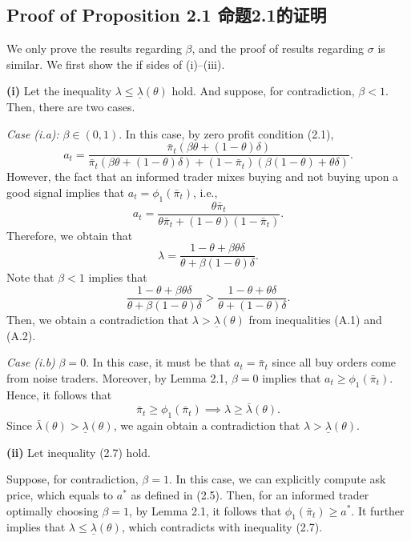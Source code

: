 \documentclass[12pt,a4paper]{article}
\newenvironment{original}{%
  \par\vspace{4pt}\noindent%
  \color{black}%
  \ignorespaces
}{%
  \par\vspace{2pt}%
}
\begin{document}
\subsection*{Proof of Proposition 2.1 \hfill 命题2.1的证明}

\begin{original}
We only prove the results regarding $\beta$, and the proof of results regarding $\sigma$ is similar. We first show the if sides of (i)--(iii).

\textbf{(i)} Let the inequality $\lambda \leq \underline{\lambda}(\theta)$ hold. And suppose, for contradiction, $\beta < 1$. Then, there are two cases.

\textit{Case (i.a):} $\beta \in (0, 1)$. In this case, by zero profit condition (2.1),
\[
a_t = \frac{\bar{\pi}_t(\beta\theta + (1-\theta)\delta)}{\bar{\pi}_t(\beta\theta + (1-\theta)\delta) + (1-\bar{\pi}_t)(\beta(1-\theta) + \theta\delta)}.
\]
However, the fact that an informed trader mixes buying and not buying upon a good signal implies that $a_t = \phi_1(\bar{\pi}_t)$, i.e.,
\[
a_t = \frac{\theta\bar{\pi}_t}{\theta\bar{\pi}_t + (1-\theta)(1-\bar{\pi}_t)}.
\]
Therefore, we obtain that
\[
\lambda = \frac{1 - \theta + \beta\theta\delta}{\theta + \beta(1-\theta)\delta}. \tag{A.1}
\]
Note that $\beta < 1$ implies that
\[
\frac{1 - \theta + \beta\theta\delta}{\theta + \beta(1-\theta)\delta} > \frac{1 - \theta + \theta\delta}{\theta + (1-\theta)\delta}. \tag{A.2}
\]
Then, we obtain a contradiction that $\lambda > \underline{\lambda}(\theta)$ from inequalities (A.1) and (A.2).

\textit{Case (i.b)} $\beta = 0$. In this case, it must be that $a_t = \bar{\pi}_t$ since all buy orders come from noise traders. Moreover, by Lemma 2.1, $\beta = 0$ implies that $a_t \geq \phi_1(\bar{\pi}_t)$. Hence, it follows that
\[
\bar{\pi}_t \geq \phi_1(\bar{\pi}_t) \implies \lambda \geq \bar{\lambda}(\theta).
\]
Since $\bar{\lambda}(\theta) > \underline{\lambda}(\theta)$, we again obtain a contradiction that $\lambda > \underline{\lambda}(\theta)$.

\textbf{(ii)} Let inequality (2.7) hold.

Suppose, for contradiction, $\beta = 1$. In this case, we can explicitly compute ask price, which equals to $a^*$ as defined in (2.5). Then, for an informed trader optimally choosing $\beta = 1$, by Lemma 2.1, it follows that $\phi_1(\bar{\pi}_t) \geq a^*$. It further implies that $\lambda \leq \underline{\lambda}(\theta)$, which contradicts with inequality (2.7).


\end{original}
\end{document}
